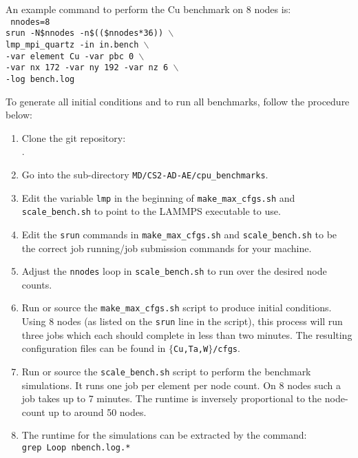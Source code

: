 \documentclass[conference]{IEEEtran}
\begin{document}


An example command to perform the Cu benchmark on 8 nodes is: \\
\texttt{%
\phantom{xxx}nnodes=8 \\
\phantom{xxx}srun -N\$nnodes -n\$((\$nnodes*36)) $\backslash$ \\
  \phantom{xxxxx}lmp\_mpi\_quartz -in in.bench $\backslash$ \\
  \phantom{xxxxx}-var element Cu -var pbc 0 $\backslash$ \\
  \phantom{xxxxx}-var nx 172 -var ny 192 -var nz 6 $\backslash$ \\
  \phantom{xxxxx}-log bench.log
}

To generate all initial conditions and to run all benchmarks, follow the procedure below:
\begin{enumerate}
\item	Clone the git repository:\\ \phantom{xxx}\gitrepo.
\item	Go into the sub-directory \texttt{MD/CS2-AD-AE/cpu\_benchmarks}.
\item	Edit the variable \texttt{lmp} in the beginning of \texttt{make\_max\_cfgs.sh} and \texttt{scale\_bench.sh} to point to the LAMMPS executable to use.
\item	Edit the \texttt{srun} commands in \texttt{make\_max\_cfgs.sh} and \texttt{scale\_bench.sh} to be the correct job running/job submission commands for your machine.
\item	Adjust the \texttt{nnodes} loop in \texttt{scale\_bench.sh} to run over the desired node counts.
\item	Run or source the \texttt{make\_max\_cfgs.sh} script to produce initial conditions. Using 8 nodes (as listed on the \texttt{srun} line in the script), this process will run three jobs which each should complete in less than two minutes. The resulting configuration files can be found in \texttt{$\{$Cu,Ta,W$\}$/cfgs}.
\item	Run or source the \texttt{scale\_bench.sh} script to perform the benchmark simulations. It runs one job per element per node count. On 8 nodes such a job takes up to 7 minutes. The runtime is inversely proportional to the node-count up to around 50 nodes.
\item	The runtime for the simulations can be extracted by the command:\\
     \phantom{xxx}\texttt{grep Loop nbench.log.*}
\end{enumerate}
\end{document}
